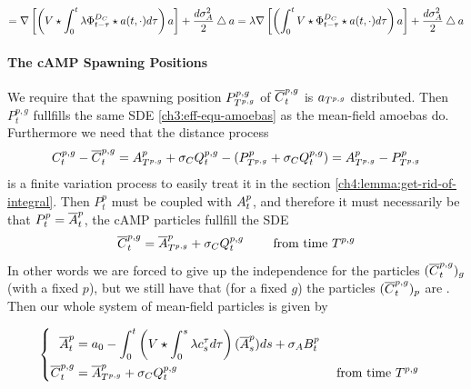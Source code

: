 \begin{align*}
= \nabla \left[ \left( V
				\star \int_0^t \lambda \Phi_{t-\tau}^{D_C} \star a(t, \cdot) 	d \tau
			\right)
			a
			\right]
	+ \frac{d\sigma_A^2}{2} \bigtriangleup a	
=  \lambda \nabla \left[ \left(
			\int_0^t  V \star \Phi_{t-\tau}^{D_C} \star a(t, \cdot) 	d \tau
			\right)
			a
			\right]
	+ \frac{d\sigma_A^2}{2} \bigtriangleup a	
\end{align*}

\paragraph{The cAMP Spawning Positions} \label{ch3:spawing-position-parameters}
We require that the spawning position $P_{T^{p,g}}^{p,g}$ of $\overline{C}_t^{p,g}$ is $a_{T^{p,g}}$ distributed.
Then $P_t^{p,g}$ fullfills the same SDE \ref{ch3:eff-equ-amoebas} as the mean-field amoebas do.
Furthermore we need that the distance process 
\begin{equation*}
	C_t^{p,g} - \overline{C}_t^{p,g}
	=
	A_{T^{p,g}}^p + \sigma_C Q_t^{p,g} - (P_{T^{p,g}}^p + \sigma_C Q_t^{p,g}) 
	= 
	A_{T^{p,g}}^p - P_{T^{p,g}}^p
\end{equation*}
is a finite variation process to easily treat it in the section \ref{ch4:lemma:get-rid-of-integral}. 
Then $P_t^p$ must be coupled with $A_t^p$, and therefore it must necessarily be that $P_t^p =  \overline{A}_t^p$, \ie the cAMP particles fullfill the SDE
\begin{equation*}
	\overline{C}_t^{p,g} = \overline{A}_{T^{p,g}}^p + \sigma_C Q_t^{p,g} \qquad\text{ from time }T^{p,g}
\end{equation*}
In other words we are forced to give up the independence for the particles $(\overline{C}_t^{p,g})_{g}$ (with a fixed $p$), but we still have that (for a fixed $g$) the particles $(\overline{C}_t^{p,g})_{p}$ are \iid.
Then our whole system of mean-field particles is given by

\begin{equation}\label{ch3:MF-particles}
\left\{
\begin{aligned}
\overline{A}_t^p &= a_0 
	- \int_0^t \left( 
		V \star \int_0^s \lambda c_s^\tau 	d \tau
	\right) (\overline{A}_s^p) ds + \sigma_A B_t^p
\\
\overline{C}_t^{p,g} &= \overline{A}_{T^{p,g}}^p + \sigma_C Q_t^{p,g} &&\text{ from time }T^{p,g}
\end{aligned}
\right.
\end{equation}

